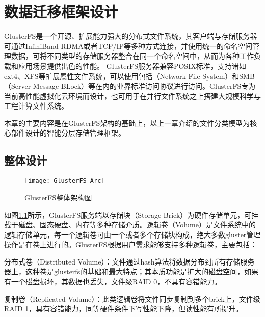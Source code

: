 \chapter{数据迁移框架设计}
GlusterFS\cite{GlusterFS}是一个开源、扩展能力强大的分布式文件系统，其客户端与存储服务器可通过InfiniBand RDMA或者TCP/IP等多种方式连接，并使用统一的命名空间管理数据，可将不同类型的存储服务器整合在同一个命名空间中，从而为各种工作负载和应用场景提供出色的性能。 GlusterFS服务器兼容POSIX标准，支持诸如ext4、XFS等扩展属性文件系统，可以使用包括（Network File System）和SMB（Server Message BLock）等在内的业界标准访问协议进行访问。GlusterFS专为当前高性能虚拟化云环境而设计，也可用于在并行文件系统之上搭建大规模科学与工程计算文件系统。 

本章的主要内容是在GlusterFS架构的基础上，以上一章介绍的文件分类模型为核心部件设计的智能分层存储管理框架。

\section{整体设计}





\begin{figure}[htp]
\centering
\texttt{[image: GlusterFS\_Arc]}
\caption{GlusterFS整体架构图}
\label{fig:GlusterFS_Arc}
\end{figure}
如图\ref{fig:GlusterFS_Arc}所示，GlusterFS服务端以存储块（Storage Brick）为硬件存储单元，可挂载于磁盘、固态硬盘、内存等多种存储介质。逻辑卷（Volume）是文件系统中的逻辑存储单元，每一个逻辑卷可由一个或者多个存储块构成，绝大多数gluster管理操作是在卷上进行的。GlusterFS根据用户需求能够支持多种逻辑卷，主要包括：

分布式卷（Distributed Volume）：文件通过hash算法将数据分布到所有存储服务器上，这种卷是glusterfs的基础和最大特点；其本质功能是扩大的磁盘空间，如果有一个磁盘损坏，其数据也丢失，文件级RAID 0，不具有容错能力。

复制卷（Replicated Volume）：此类逻辑卷将文件同步复制到多个brick上，文件级RAID 1，具有容错能力，同等硬件条件下写性能下降，但读性能有所提升。

